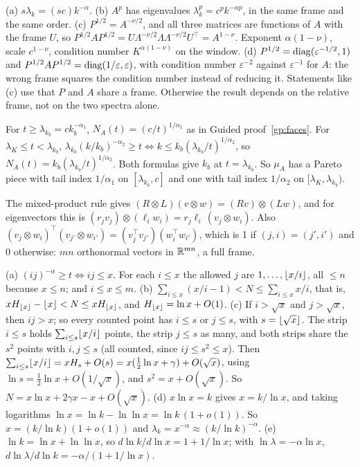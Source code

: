 (a) $s\lambda_k=(sc)k^{-\alpha}$.
\newline (b) $A^p$ has eigenvalues $\lambda_k^p=c^pk^{-\alpha p}$, in the same frame and the same order.
\newline (c) $P^{1/2}=A^{-\nu/2}$, and all three matrices are functions of $A$ with the frame $U$, so
$P^{1/2}AP^{1/2}=U\Lambda^{-\nu/2}\Lambda\Lambda^{-\nu/2}U^\top=A^{1-\nu}$. Exponent $\alpha(1-\nu)$, scale $c^{1-\nu}$,
condition number $K^{\alpha(1-\nu)}$ on the window.
\newline (d) $P^{1/2}=\operatorname{diag}(\varepsilon^{-1/2},1)$ and $P^{1/2}AP^{1/2}=\operatorname{diag}(1/\varepsilon,\varepsilon)$, with condition number
$\varepsilon^{-2}$ against $\varepsilon^{-1}$ for $A$: the wrong frame squares the condition number instead of
reducing it. Statements like (c) use that $P$ and $A$ share a frame. Otherwise the result depends on the relative
frame, not on the two spectra alone.

For $t\ge\lambda_{k_b}=ck_b^{-\alpha_1}$, $N_A(t)=(c/t)^{1/\alpha_1}$ as in Guided proof~\ref{gp:faces}. For
$\lambda_K\le t<\lambda_{k_b}$, $\lambda_{k_b}(k/k_b)^{-\alpha_2}\ge t\iff k\le k_b(\lambda_{k_b}/t)^{1/\alpha_2}$, so
$N_A(t)=k_b(\lambda_{k_b}/t)^{1/\alpha_2}$. Both formulas give $k_b$ at $t=\lambda_{k_b}$. So $\mu_A$ has a Pareto
piece with tail index $1/\alpha_1$ on $[\lambda_{k_b},c]$ and one with tail index $1/\alpha_2$ on
$[\lambda_K,\lambda_{k_b})$.

The mixed-product rule gives $(R\otimes L)(v\otimes w)=(Rv)\otimes(Lw)$, and for eigenvectors this is
$(r_jv_j)\otimes(\ell_iw_i)=r_j\ell_i\,(v_j\otimes w_i)$. Also
$(v_j\otimes w_i)^\top(v_{j'}\otimes w_{i'})=(v_j^\top v_{j'})(w_i^\top w_{i'})$, which is 1 if $(j,i)=(j',i')$ and 0
otherwise: $mn$ orthonormal vectors in $\mathbb{R}^{mn}$, a full frame.

(a) $(ij)^{-\alpha}\ge t\iff ij\le x$. For each $i\le x$ the allowed $j$ are $1,\dots,\lfloor x/i\rfloor$, all $\le n$
because $x\le n$; and $i\le x\le m$.
\newline (b) $\sum_{i\le x}(x/i-1)<N\le\sum_{i\le x}x/i$, that is, $xH_{\lfloor x\rfloor}-\lfloor x\rfloor<N\le xH_{\lfloor x\rfloor}$, and
$H_{\lfloor x\rfloor}=\ln x+O(1)$.
\newline (c) If $i>\sqrt x$ and $j>\sqrt x$, then $ij>x$; so every counted point has $i\le s$ or $j\le s$, with
$s=\lfloor\sqrt x\rfloor$. The strip $i\le s$ holds $\sum_{i\le s}\lfloor x/i\rfloor$ points, the strip $j\le s$ as many, and both
strips share the $s^2$ points with $i,j\le s$ (all counted, since $ij\le s^2\le x$). Then
$\sum_{i\le s}\lfloor x/i\rfloor=xH_s+O(s)=x(\tfrac12\ln x+\gamma)+O(\sqrt x)$, using $\ln s=\frac12\ln x+O(1/\sqrt x)$, and
$s^2=x+O(\sqrt x)$. So $N=x\ln x+2\gamma x-x+O(\sqrt x)$.
\newline (d) $x\ln x=k$ gives $x=k/\ln x$, and taking logarithms $\ln x=\ln k-\ln\ln x=\ln k\,(1+o(1))$. So
$x=(k/\ln k)(1+o(1))$ and $\lambda_k=x^{-\alpha}\approx(k/\ln k)^{-\alpha}$.
\newline (e) $\ln k=\ln x+\ln\ln x$, so $d\ln k/d\ln x=1+1/\ln x$; with $\ln\lambda=-\alpha\ln x$,
$d\ln\lambda/d\ln k=-\alpha/(1+1/\ln x)$.


